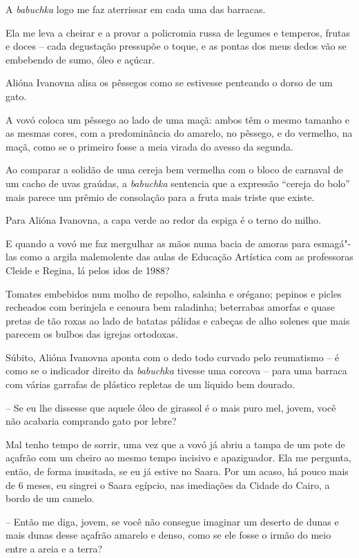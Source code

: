 A \emph{babuchka} logo me faz aterrissar em cada uma das barracas.

Ela me leva a cheirar e a provar a policromia russa de legumes e
temperos, frutas e doces -- cada degustação pressupõe o toque, e as
pontas dos meus dedos vão se embebendo de sumo, óleo e açúcar.

Alióna Ivanovna alisa os pêssegos como se estivesse penteando o dorso de
um gato.

A vovó coloca um pêssego ao lado de uma maçã: ambos têm o mesmo tamanho
e as mesmas cores, com a predominância do amarelo, no pêssego, e do
vermelho, na maçã, como se o primeiro fosse a meia virada do avesso da
segunda.

Ao comparar a solidão de uma cereja bem vermelha com o bloco de carnaval
de um cacho de uvas graúdas, a \emph{babuchka} sentencia que a expressão
``cereja do bolo'' mais parece um prêmio de consolação para a fruta mais
triste que existe.

Para Alióna Ivanovna, a capa verde ao redor da espiga é o terno do
milho.

E quando a vovó me faz mergulhar as mãos numa bacia de amoras para
esmagá"-las como a argila malemolente das aulas de Educação Artística com
as professoras Cleide e Regina, lá pelos idos de 1988?

Tomates embebidos num molho de repolho, salsinha e orégano; pepinos e
picles recheados com berinjela e cenoura bem raladinha; beterrabas
amorfas e quase pretas de tão roxas ao lado de batatas pálidas e cabeças
de alho solenes que mais parecem os bulbos das igrejas ortodoxas.

Súbito, Alióna Ivanovna aponta com o dedo todo curvado pelo reumatismo
-- é como se o indicador direito da \emph{babuchka} tivesse uma corcova
-- para uma barraca com várias garrafas de plástico repletas de um
líquido bem dourado.

-- Se eu lhe dissesse que aquele óleo de girassol é o mais puro mel,
jovem, você não acabaria comprando gato por lebre?

Mal tenho tempo de sorrir, uma vez que a vovó já abriu a tampa de um
pote de açafrão com um cheiro ao mesmo tempo incisivo e apaziguador. Ela
me pergunta, então, de forma inusitada, se eu já estive no Saara. Por um
acaso, há pouco mais de 6 meses, eu singrei o Saara egípcio, nas
imediações da Cidade do Cairo, a bordo de um camelo.

-- Então me diga, jovem, se você não consegue imaginar um deserto de
dunas e mais dunas desse açafrão amarelo e denso, como se ele fosse o
irmão do meio entre a areia e a terra?

